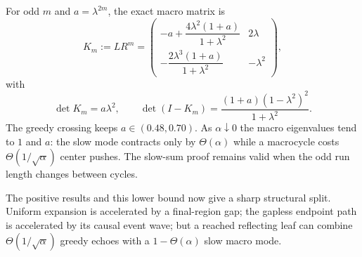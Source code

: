 For odd $m$ and $a=\lambda^{2m}$, the exact macro matrix is
\begin{equation}
 K_m:=LR^m
 =\begin{pmatrix}
 -a+\dfrac{4\lambda^2(1+a)}{1+\lambda^2}&2\lambda\\[5pt]
 -\dfrac{2\lambda^3(1+a)}{1+\lambda^2}&-\lambda^2
 \end{pmatrix},
 \label{eq:direct-three-vertex-macro-matrix}
\end{equation}
with
\begin{equation}
 \det K_m=a\lambda^2,
 \qquad
 \det(I-K_m)=
 \frac{(1+a)(1-\lambda^2)^2}{1+\lambda^2}.
 \label{eq:direct-three-vertex-macro-spectrum}
\end{equation}
The greedy crossing keeps $a\in(0.48,0.70)$.  As $\alpha\downarrow0$ the
macro eigenvalues tend to $1$ and $a$: the slow mode contracts only by
$\Theta(\alpha)$ while a macrocycle costs
$\Theta(1/\sqrt\alpha)$ center pushes.  The slow-sum proof remains valid
when the odd run length changes between cycles.

The positive results and this lower bound now give a sharp structural split.
Uniform expansion is accelerated by a final-region gap; the gapless endpoint
path is accelerated by its causal event wave; but a reached reflecting leaf
can combine $\Theta(1/\sqrt\alpha)$ greedy echoes with a
$1-\Theta(\alpha)$ slow macro mode.
